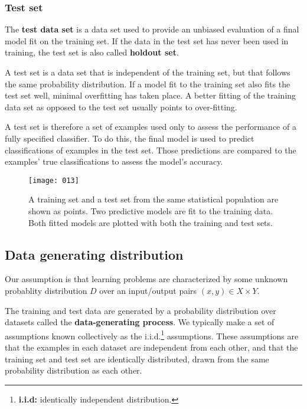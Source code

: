 \subsubsection{Test set}
The \textbf{test data set} is a data set used to provide an unbiased evaluation of a final model fit on the training set. If the data in the test set has never been used in training, the test set is also called \textbf{holdout set}.

A test set is a data set that is independent of the training set, but that follows the same probability distribution. If a model fit to the training set also fits the test set well, minimal overfitting has taken place. A better fitting of the training data set as opposed to the test set usually points to over-fitting.

A test set is therefore a set of examples used only to assess the performance of a fully specified classifier. To do this, the final model is used to predict classifications of examples in the test set. Those predictions are compared to the examples' true classifications to assess the model's accuracy.

\begin{figure}[h]
\begin{center}
    \texttt{[image: 013]}
    \caption{}
\end{center}
\caption{A training set and a test set from the same statistical population are shown as points. Two predictive models are fit to the training data. Both fitted models are plotted with both the training and test sets.}
\end{figure}

\subsection{Data generating distribution}
Our assumption is that learning problems are characterized by some unknown probablity distribution \(D\) over an input/output pairs \((x,y) \in X \times Y\). 

The training and test data are generated by a probability distribution over datasets called the \textbf{data-generating process}. We typically make a set of assumptions known collectively as the i.i.d.\footnote{\textbf{i.i.d:} identically independent distribution.} assumptions. These assumptions are that the examples in each dataset are independent from each other, and that the training set and test set are identically distributed, drawn from the same probability distribution as each other. 


